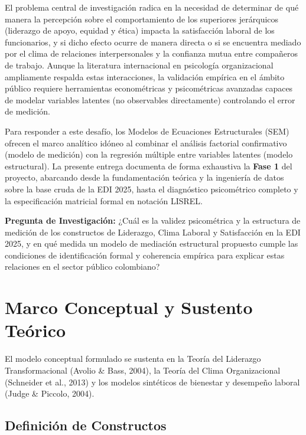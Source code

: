 \documentclass[11pt, a4paper]{article} %
\begin{document}
El problema central de investigación radica en la necesidad de determinar de qué manera la percepción sobre el comportamiento de los superiores jerárquicos (liderazgo de apoyo, equidad y ética) impacta la satisfacción laboral de los funcionarios, y si dicho efecto ocurre de manera directa o si se encuentra mediado por el clima de relaciones interpersonales y la confianza mutua entre compañeros de trabajo. Aunque la literatura internacional en psicología organizacional ampliamente respalda estas interacciones, la validación empírica en el ámbito público requiere herramientas econométricas y psicométricas avanzadas capaces de modelar variables latentes (no observables directamente) controlando el error de medición.

Para responder a este desafío, los Modelos de Ecuaciones Estructurales (SEM) ofrecen el marco analítico idóneo al combinar el análisis factorial confirmativo (modelo de medición) con la regresión múltiple entre variables latentes (modelo estructural). La presente entrega documenta de forma exhaustiva la \textbf{Fase 1} del proyecto, abarcando desde la fundamentación teórica y la ingeniería de datos sobre la base cruda de la EDI 2025, hasta el diagnóstico psicométrico completo y la especificación matricial formal en notación LISREL.

\textbf{Pregunta de Investigación:} ¿Cuál es la validez psicométrica y la estructura de medición de los constructos de Liderazgo, Clima Laboral y Satisfacción en la EDI 2025, y en qué medida un modelo de mediación estructural propuesto cumple las condiciones de identificación formal y coherencia empírica para explicar estas relaciones en el sector público colombiano?

\section{Marco Conceptual y Sustento Teórico}

El modelo conceptual formulado se sustenta en la Teoría del Liderazgo Transformacional (Avolio \& Bass, 2004), la Teoría del Clima Organizacional (Schneider et al., 2013) y los modelos sintéticos de bienestar y desempeño laboral (Judge \& Piccolo, 2004).

\subsection{Definición de Constructos}
\end{document}
